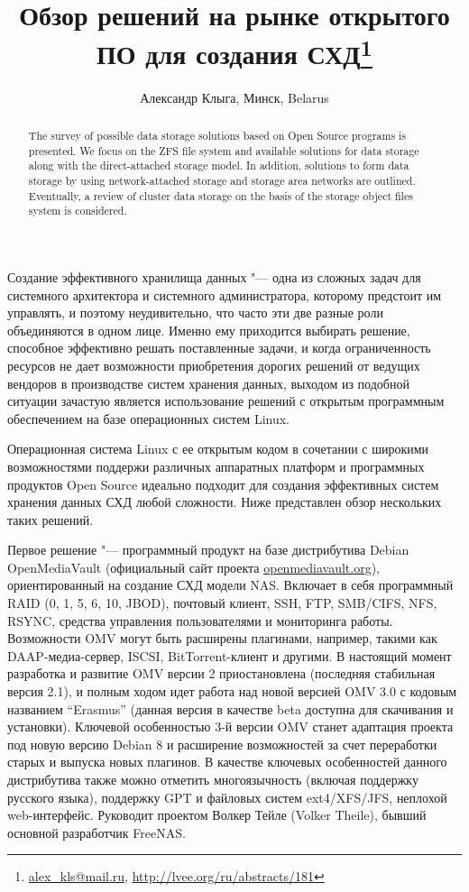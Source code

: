 \documentclass[10pt, a5paper]{article}
\begin{document}
\title{Обзор решений на рынке открытого ПО для создания СХД\footnote{\url{alex_kls@mail.ru}, \url{http://lvee.org/ru/abstracts/181}}}
\author{Александр Клыга, Минск, Belarus}
\maketitle
\begin{abstract}
The survey of possible data storage solutions based on Open Source programs is presented. We focus on the ZFS file system and available solutions for data storage along with the direct-attached storage model. In addition, solutions to form data stora\-ge by using network-attached storage and storage area networks are outlined. Eventually, a review of  cluster data storage on the basis of the storage object files system is considered.
\end{abstract}
Создание эффективного хранилища данных "--- одна из сложных задач для системного архитектора и системного администратора, которому предстоит им управлять, и поэтому неудивительно, что  часто эти две разные роли объединяются в одном лице. Именно ему приходится выбирать решение, способное эффективно решать поставленные задачи, и когда ограниченность ресурсов не дает возможности приобретения дорогих решений от ведущих вендоров в производстве систем хранения данных, выходом из подобной ситуации зачастую является использование решений с открытым программным обеспечением на базе операционных систем Linux.

Операционная система Linux с ее открытым кодом в сочетании с широкими возможностями поддержи различных аппаратных платформ и программных продуктов Open Source идеально подходит для создания эффективных систем хранения данных СХД любой сложности. Ниже представлен обзор нескольких таких решений.

Первое решение "--- программный продукт на базе дистрибутива Debian OpenMediaVault (официальный сайт проекта \linebreak\url{openmediavault.org}), ориентированный на создание СХД модели NAS. Включает в себя программный RAID (0, 1, 5, 6, 10, JBOD), почтовый клиент, SSH, FTP, SMB/CIFS, NFS, RSYNC, средства управления пользователями и  мониторинга работы. Возможности OMV могут быть расширены плагинами, например, такими как DAAP-медиа-сервер, ISCSI, BitTorrent-клиент и другими. В настоящий момент разработка и развитие OMV версии 2 приостановлена (последняя стабильная версия 2.1), и  полным ходом идет  работа над новой версией OMV 3.0 с кодовым названием ``Erasmus'' (данная версия в качестве beta доступна для скачивания и установки). Ключевой особенностью 3-й версии OMV станет адаптация проекта под новую версию Debian 8 и расширение возможностей за счет переработки старых и выпуска новых плагинов. В качестве ключевых особенностей данного дистрибутива также можно отметить многоязычность (включая поддержку русского языка), поддержку GPT и файловых систем ext4/XFS/JFS, неплохой web-интерфейс. Руководит проектом Волкер Тейле (Volker Theile), бывший основной разработчик FreeNAS.
\end{document}
